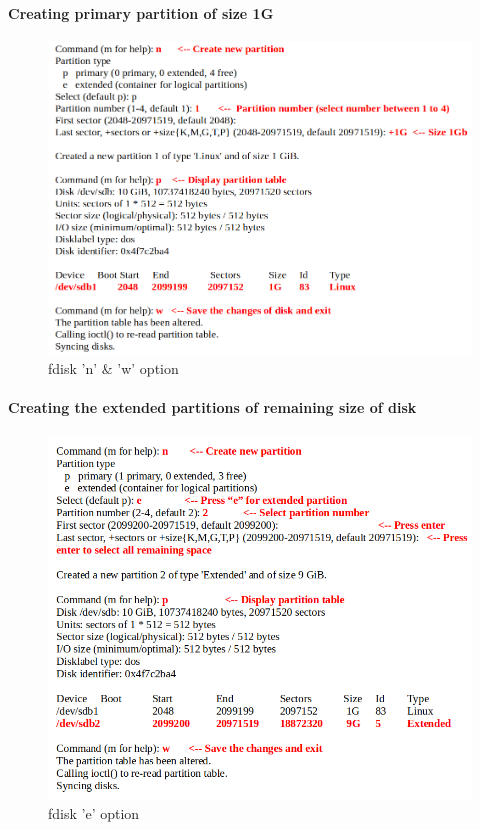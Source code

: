 \begin{flushleft}
\paragraph{Creating primary partition of size 1G}
\begin{figure}[h!]
	\centering
	\includegraphics[scale=.4]{content/chapter8/images/fdisk2.png}
	\caption{fdisk 'n' \& 'w' option}
	\label{n_w_option}
\end{figure}		

\newpage
\paragraph{Creating the extended partitions of remaining size of disk}

\begin{figure}[h!]
	\centering
	\includegraphics[scale=.5]{content/chapter8/images/fdisk3.png}
	\caption{fdisk 'e' option}
	\label{e_option}
\end{figure}		


\end{flushleft}
